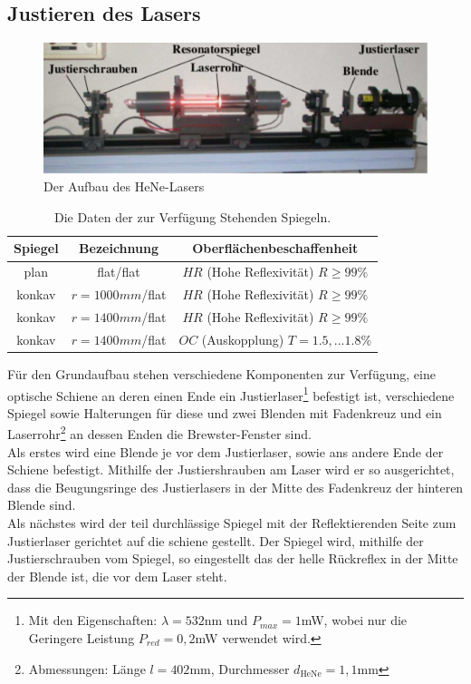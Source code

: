 \subsection{Justieren des Lasers}
\begin{figure}[h!]
\centering
\includegraphics[scale=0.75]{../Grafiken/Aufbau.pdf}
\caption{Der Aufbau des HeNe-Lasers\cite{V61}}\label{Aufbau}
\end{figure}
\begin{table}
\centering
\begin{tabular}{c c c}
Spiegel & Bezeichnung & Oberflächenbeschaffenheit \\\hline
plan & flat/flat & $HR$ (Hohe Reflexivität) $R\ge 99\%$\\
konkav & $r=1000mm$/flat & $HR$ (Hohe Reflexivität) $R\ge 99\%$\\
konkav & $r=1400mm$/flat & $HR$ (Hohe Reflexivität) $R\ge 99\%$\\
konkav & $r=1400mm$/flat & $OC$ (Auskopplung) $T=1.5,...1.8\% $
\end{tabular}
\caption{Die Daten der zur Verfügung Stehenden Spiegeln.\cite{V61}\label{Eigenschaften}}
\end{table}
Für den Grundaufbau stehen verschiedene Komponenten zur Verfügung, eine optische Schiene an deren einen Ende ein Justierlaser\footnote{Mit den Eigenschaften: $\lambda=532$nm und $P_{max}=1$mW, wobei nur die Geringere Leistung $P_{red}=0,2$mW verwendet wird.} befestigt ist, verschiedene Spiegel sowie Halterungen für diese und zwei Blenden mit Fadenkreuz und ein Laserrohr\footnote{Abmessungen: Länge $l=402$mm, Durchmesser $d_{\text{HeNe}}=1,1$mm} an dessen Enden die Brewster-Fenster sind.\\ 
Als erstes wird eine Blende je vor dem Justierlaser, sowie ans andere Ende der Schiene befestigt. Mithilfe der Justiershrauben am Laser wird er so ausgerichtet, dass die Beugungsringe des Justierlasers in der Mitte des Fadenkreuz der hinteren Blende sind.\\
Als nächstes wird der teil durchlässige Spiegel mit der Reflektierenden Seite zum Justierlaser gerichtet auf die schiene gestellt. Der Spiegel wird, mithilfe der Justierschrauben vom Spiegel, so eingestellt das der helle Rückreflex in der Mitte der Blende ist, die vor dem Laser steht.\\ 
